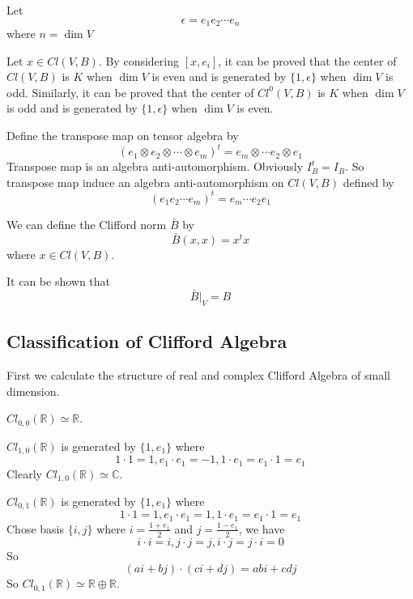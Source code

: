 \documentclass[12pt]{book}
\begin{document}
	Let
	\begin{equation}
		\epsilon=e_1e_2\cdots e_n
	\end{equation}
	where $n=\dim V$
	
	Let $x\in Cl(V,B)$. By considering $[x,e_i]$, it can be proved that the center of $Cl(V,B)$ is $K$ when $\dim V$ is even and is generated by $\{1,\epsilon\}$ when $\dim V$ is odd. Similarly, it can be proved that the center of $Cl^0(V,B)$ is $K$ when $\dim V$ is odd and is generated by $\{1,\epsilon\}$ when $\dim V$ is even.
	
	Define the transpose map on tensor algebra by
	\begin{equation}
		(e_1\otimes e_2\otimes\cdots\otimes e_m)^t=e_m\otimes\cdots e_2\otimes e_1
	\end{equation}
	Transpose map is an algebra anti-automorphism. Obviously $I_B^t=I_B$. So transpose map induce an algebra anti-automorphism on $Cl(V,B)$ defined by
	\begin{equation}
		(e_1e_2\cdots e_m)^t=e_m\cdots e_2e_1
	\end{equation}
	
	We can define the Clifford norm $\bar B$ by
	\begin{equation}
		\bar B(x,x)=x^tx
	\end{equation}
	where $x\in Cl(V,B)$.
	
	It can be shown that
	\begin{equation}
		\bar B|_V=B
	\end{equation}
	
	\subsection{Classification of Clifford Algebra}
	
	First we calculate the structure of real and complex Clifford Algebra of small dimension.
	
	$Cl_{0,0}(\mathbb R)\simeq\mathbb R$.
	
	$Cl_{1,0}(\mathbb R)$ is generated by $\{1,e_1\}$ where
	\begin{equation}
		1\cdot 1=1, e_1\cdot e_1=-1, 1\cdot e_1=e_1\cdot 1=e_1
	\end{equation}
	Clearly $Cl_{1,0}(\mathbb R)\simeq \mathbb C$.
	
	$Cl_{0,1}(\mathbb R)$ is generated by $\{1,e_1\}$ where
	\begin{equation}
		1\cdot 1=1, e_1\cdot e_1=1, 1\cdot e_1=e_1\cdot 1=e_1
	\end{equation}
	Chose basis $\{i,j\}$ where $i=\frac{1+e_1}2$ and $j=\frac{1-e_1}2$, we have
	\begin{equation}
		i\cdot i=i, j\cdot j=j, i\cdot j=j\cdot i=0
	\end{equation}
	So 
	\begin{equation}
		(ai+bj)\cdot(ci+dj)=abi+cdj
	\end{equation}
	So $Cl_{0,1}(\mathbb R)\simeq \mathbb R\oplus\mathbb R$.
	
\end{document}
